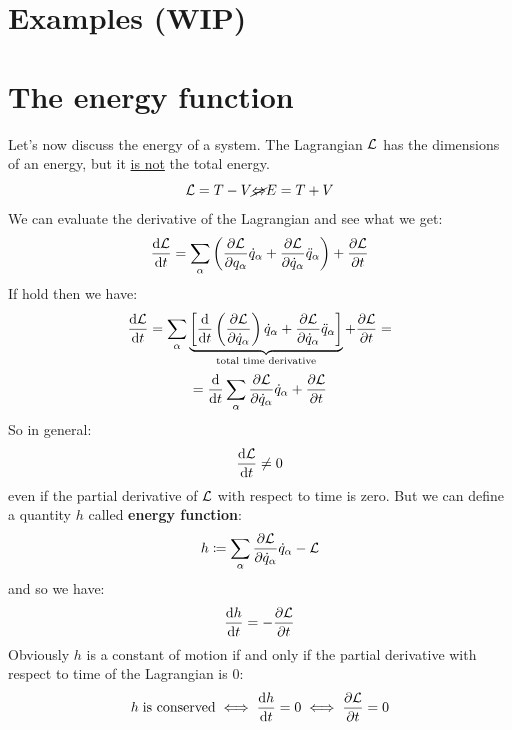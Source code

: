 \section{Examples (WIP)}
\section{The energy function}
Let's now discuss the energy of a system. The Lagrangian $\mathcal{L}$ has the dimensions of an energy, but it \underline{is not} the total energy.
\begin{equation}
    \mathcal{L} = T - V \cancel{\Leftrightarrow} E = T + V
\end{equation}
We can evaluate the derivative of the Lagrangian and see what we get:
\begin{equation}
    \dfrac{\mathrm{d}\mathcal{L}}{\mathrm{d}t} = \displaystyle\sum_{\alpha}\left(\dfrac{\partial \mathcal{L}}{\partial q_{\alpha}}\dot{q}_{\alpha} + \dfrac{\partial \mathcal{L}}{\partial \dot{q}_{\alpha}}\ddot{q}_{\alpha}\right) + \dfrac{\partial \mathcal{L}}{\partial t}
\end{equation}
If \eleref\;hold then we have:
\begin{equation}
    \dfrac{\mathrm{d}\mathcal{L}}{\mathrm{d}t} = \displaystyle\sum_{\alpha}\underbrace{\left[\dfrac{\mathrm{d} }{\mathrm{d}t}\left(\dfrac{\partial \mathcal{L}}{\partial \dot{q}_{\alpha}}\right)\dot{q}_{\alpha} + \dfrac{\partial \mathcal{L}}{\partial \dot{q}_{\alpha}}\ddot{q}_{\alpha}\right]}_{\text{total time derivative}} + \dfrac{\partial \mathcal{L}}{\partial t} =
\end{equation}
\begin{equation}
 = \dfrac{\mathrm{d} }{\mathrm{d}t}\displaystyle\sum_{\alpha}\dfrac{\partial \mathcal{L}}{\partial \dot{q}_{\alpha}}\dot{q}_{\alpha} + \dfrac{\partial \mathcal{L}}{\partial t}
\end{equation}
So in general:
\begin{equation}
    \dfrac{\mathrm{d}\mathcal{L}}{\mathrm{d}t} \neq 0
\end{equation}
even if the partial derivative of $\mathcal{L}$ with respect to time is zero. But we can define a quantity $h$ called \textbf{energy function}:
\begin{equation}
    h \coloneqq \displaystyle\sum_{\alpha}\dfrac{\partial \mathcal{L}}{\partial \dot{q}_{\alpha}}\dot{q}_{\alpha} - \mathcal{L}
\end{equation}
and so we have:
\begin{equation}
    \dfrac{\mathrm{d}h}{\mathrm{d}t} = -\dfrac{\partial \mathcal{L}}{\partial t}
\end{equation}
Obviously $h$ is a constant of motion if and only if the partial derivative with respect to time of the Lagrangian is 0:
\begin{equation}
    h\;\text{is conserved} \iff \dfrac{\mathrm{d}h}{\mathrm{d}t} = 0 \iff \dfrac{\partial \mathcal{L}}{\partial t} = 0
\end{equation}
